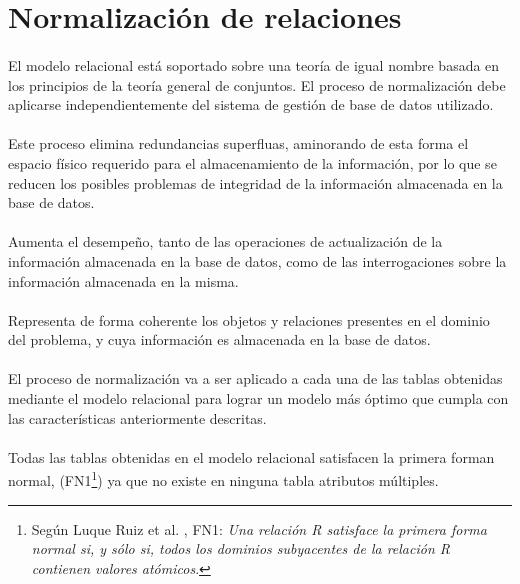 \section{Normalización de relaciones}

  \paragraph{}El modelo relacional está soportado sobre una teoría de igual
  nombre basada en los principios de la teoría general de conjuntos. El
  proceso de normalización debe aplicarse independientemente del
  sistema de gestión de base de datos utilizado.

  \paragraph{}Este proceso elimina redundancias superfluas, aminorando de
  esta forma el espacio físico requerido para el almacenamiento de la
  información, por lo que se reducen los posibles problemas de
  integridad de la información almacenada en la base de datos.

  \paragraph{}Aumenta el desempeño, tanto de las operaciones de
  actualización de la información almacenada en la base de datos,
  como de las interrogaciones sobre la información almacenada en la
  misma.

  \paragraph{}Representa de forma coherente los objetos y relaciones
  presentes en el dominio del problema, y cuya información es
  almacenada en la base de datos.

  \paragraph{}El proceso de normalización va a ser aplicado a cada una de
  las tablas obtenidas mediante el modelo relacional para lograr un
  modelo más óptimo que cumpla con las características anteriormente
  descritas.

  \paragraph{}Todas las tablas obtenidas en el modelo relacional satisfacen
  la primera forman normal, (FN1\footnote{Según Luque Ruiz et al.
  \cite{luqueRuiz}, FN1: \textit{Una relación R satisface
  la primera forma normal si, y sólo si, todos los dominios subyacentes de la
  relación R contienen valores atómicos}.}) ya que no existe en ninguna tabla
  atributos múltiples.

